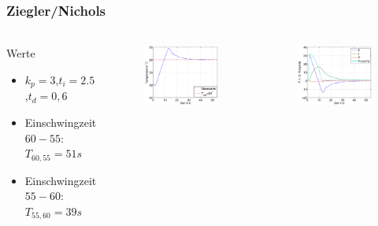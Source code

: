 \begin{frame}
\frametitle{Ziegler/Nichols}
\framesubtitle{}
    \begin{columns}[c]
        \begin{block}{Werte}
             \begin{itemize}
                 \item $k_p=3$,$t_i=2.5$,$t_d=0,6$
                 \item Einschwingzeit $60-55$: $T_{60,55} =51s$
                 \item Einschwingzeit $55-60$: $T_{55,60} =39s$
             \end{itemize}
        \end{block}
            \begin{figure}[H]
            \begin{center}
                    \includegraphics[scale=0.3]{./img/plots/2g.eps}
            \end{center}
            \end{figure}
            \begin{figure}[H]
            \begin{center}
                    \includegraphics[scale=0.3]{./img/plots/2g_aus.eps}

\end{center}
\end{figure}
\end{columns}
\end{frame}
